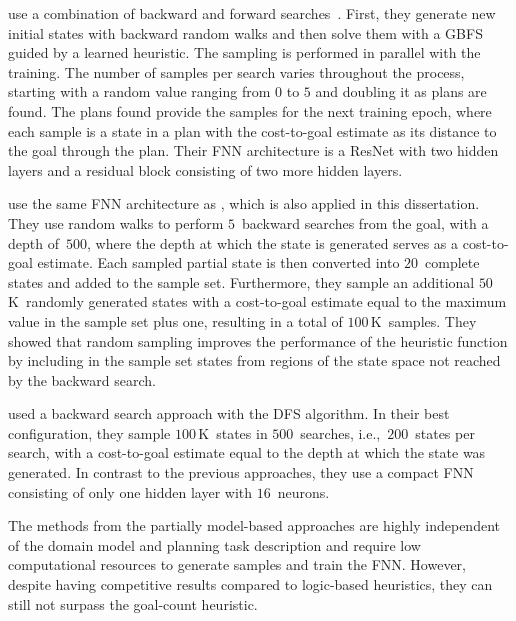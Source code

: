 \citet{ferber2022neural} use a combination of backward and forward searches~\cite{arfaee2011learning}. First, they generate new initial states with backward random walks and then solve them with a GBFS guided by a learned heuristic. The sampling is performed in parallel with the training. The number of samples per search varies throughout the process, starting with a random value ranging from $0$ to $5$ and doubling it as plans are found. The plans found provide the samples for the next training epoch, where each sample is a state in a plan with the cost-to-goal estimate as its distance to the goal through the plan. Their FNN architecture is a ResNet with two hidden layers and a residual block consisting of two more hidden layers.

\citet{otoole2022sampling} use the same FNN architecture as \citet{ferber2022neural}, which is also applied in this dissertation. They use random walks to perform $5$~backward searches from the goal, with a depth of~$500$, where the depth at which the state is generated serves as a cost-to-goal estimate. Each sampled partial state is then converted into $20$~complete states and added to the sample set. Furthermore, they sample an additional $50$\,K~randomly generated states with a cost-to-goal estimate equal to the maximum value in the sample set plus one, resulting in a total of $100$\,K~samples. They showed that random sampling improves the performance of the heuristic function by including in the sample set states from regions of the state space not reached by the backward search.

\citet{yu2020learning} used a backward search approach with the DFS algorithm. In their best configuration, they sample $100$\,K~states in $500$~searches, i.e.,~$200$~states per search, with a cost-to-goal estimate equal to the depth at which the state was generated. In contrast to the previous approaches, they use a compact FNN consisting of only one hidden layer with $16$~neurons.

The methods from the partially model-based approaches are highly independent of the domain model and planning task description and require low computational resources to generate samples and train the FNN. However, despite having competitive results compared to logic-based heuristics, they can still not surpass the goal-count heuristic.
